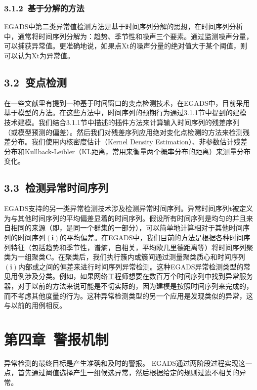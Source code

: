 \documentclass[a4paper,AutoFakeBold,oneside,12pt]{book}
\begin{document}
\subsection*{3.1.2\ 基于分解的方法}

EGADS中第二类异常值检测方法是基于时间序列分解的思想，在时间序列分析中，通常将时间序列分解为：趋势、季节性和噪声三个要素。通过监测噪声分量，可以捕获异常值。更准确地说，如果点Xt的噪声分量的绝对值大于某个阈值，则可以认为Xt为异常值。

\section*{3.2\ 变点检测}

在一些文献里有提到一种基于时间窗口的变点检测技术，在EGADS中，目前采用基于模型的方法。在这些方法中，时间序列的预期行为通过3.1.1节中提到的建模技术建模。我们结合3.1.1节中描述的插件方法来计算输入时间序列的残差序列（或模型预测的偏差）。然后我们对残差序列应用绝对变化点检测的方法来检测残差分布。我们使用内核密度估计（Kernel Density Estimation）、非参数估计残差分布和Kullback-Leibler（KL距离，常用来衡量两个概率分布的距离）来测量分布变化。

\section*{3.3\ 检测异常时间序列}

EGADS支持的另一类异常检测技术涉及检测异常时间序列。异常时间序列$\bm{t}$被定义为与其他时间序列的平均偏差显着的时间序列。假设所有时间序列是均匀的并且来自相同的来源（即，是同一个群集的一部分），可以简单地计算相对于其他时间序列的时间序列$\bm{(i)}$的平均偏差。在EGADS中，我们目前的方法是根据各种时间序列特征（包括趋势和季节性，谱熵，自相关，平均欧几里德距离等）将时间序列聚类为一组聚类$\bm{C}$。在聚类后，我们执行簇内或簇间通过测量聚类质心和时间序列$\bm{(i)}$内部或之间的偏差来进行时间序列异常检测。这种EGADS异常检测类型的常见用例涉及分类。例如，如果网络工程师想要在数百万个时间序列中找到异常服务器，对于以前的方法来说可能是不切实际的，因为建模是按照时间序列来完成的，而不考虑其他度量的行为。这种异常检测类型的另一个应用是发现类似的异常，这与以前的用例相反。

\chapter*{第四章\ 警报机制}
异常检测的最终目标是产生准确和及时的警报。 EGADS通过两阶段过程实现这一点，首先通过阈值选择产生一组候选异常，然后根据给定的规则过滤不相关的异常。
\end{document}
